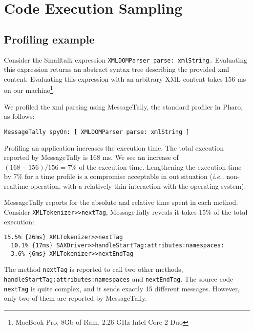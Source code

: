 \documentclass{sig-alternate}
\newcommand{\ct}{\lstinline[backgroundcolor=\color{white},basicstyle=\footnotesize\ttfamily]}
\newcommand{\vp}[1]{\nb{Vanessa}{orange}{#1}}
\newcommand{\ie}{\emph{i.e.,}\xspace}
\newcommand{\seclabel}[1]{\label{sec:#1}}
\begin{document}
\section{Code Execution Sampling} \seclabel{executionSampling}

\subsection{Profiling example}


Consider the Smalltalk expression \ct{XMLDOMParser parse: xmlString.} Evaluating this expression returns an abstract syntax tree describing the provided xml content. Evaluating this expression with an arbitrary XML content takes 156 ms on our machine\footnote{MacBook Pro, 8Gb of Ram, 2.26 GHz Intel Core 2 Duo}. 


We profiled the xml parsing using MessageTally, the standard profiler in Pharo, as follows:

\begin{lstlisting}
MessageTally spyOn: [ XMLDOMParser parse: xmlString ]
\end{lstlisting}

Profiling an application increases the execution time. 
The total execution reported by MessageTally is 168 ms. We see an increase of $(168 - 156) / 156 = 7\%$ of the execution time. Lengthening the execution time by 7\% for a time profile is a compromise acceptable in out \vp{our?} situation (\ie non-realtime operation, with a relatively thin interaction with the operating system).

MessageTally reports for the absolute and relative time spent in each method. Consider \ct{XMLTokenizer>>nextTag}, MessageTally reveals it takes 15\% of the total execution:

\begin{lstlisting}
15.5% {26ms} XMLTokenizer>>nextTag
  10.1% {17ms} SAXDriver>>handleStartTag:attributes:namespaces:
  3.6% {6ms} XMLTokenizer>>nextEndTag
\end{lstlisting}

The method \ct{nextTag} is reported to call two other methods, \ct{handleStartTag:attributes:namespaces} and \ct{nextEndTag}. The source code \ct{nextTag} is quite complex, and it sends exactly 15 different messages. However, only two of them are reported by MessageTally.
\end{document}
